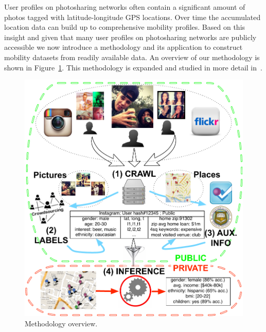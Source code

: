 

User profiles on photosharing networks often contain a significant amount of photos tagged with latitude-longitude GPS locations. Over time the accumulated location data can build up to comprehensive mobility profiles. Based on this insight and given that many user profiles on photosharing networks are publicly accessible we now introduce a methodology and its application to construct mobility datasets from readily available data. An overview of our methodology is shown in Figure~\ref{fig:system}. 
This methodology is expanded and studied in more detail in~.

\begin{figure}
	\begin{center}
		\includegraphics[width=\linewidth]{fig/footprints/system.pdf}
	\end{center}
	\caption{Methodology overview. 
	}
	\label{fig:system}
\end{figure}

